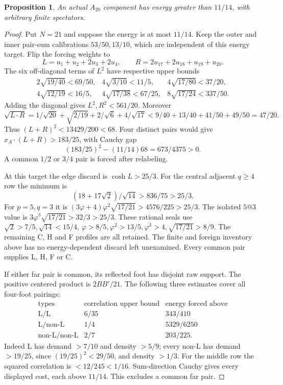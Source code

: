 \documentclass[11pt]{article}
\newtheorem{proposition}[theorem]{Proposition}
\theoremstyle{remark}
\newcommand{\ph}{\varphi}
\begin{document}
\begin{proposition}\label{prop:A20}
An actual \(A_{20}\) component has energy greater than \(11/14\),
with arbitrary finite spectators.
\end{proposition}
\begin{proof}
Put \(N=21\) and suppose the energy is at most \(11/14\).
Keep the outer and inner pair-sum calibrations \(53/50,13/10\),
which are independent of this energy target. Flip the forcing
weights to
\[
 L=u_1+u_2+2u_3+2u_4,\qquad
 R=2u_{17}+2u_{18}+u_{19}+u_{20}.
\]
The six off-diagonal terms of \(L^2\) have respective upper bounds
\[
\begin{array}{lll}
 2\sqrt{19/40}<69/50,&4\sqrt{3/10}<11/5,&
 4\sqrt{17/80}<37/20,\\
 4\sqrt{12/19}<16/5,&4\sqrt{17/38}<67/25,&
 8\sqrt{17/24}<337/50 .
\end{array}
\]
Adding the diagonal gives \(L^2,R^2<561/20\). Moreover
\[
 \sqrt{L\cdot R}
 =1/\sqrt{20}+\sqrt{2/19}+2/\sqrt6+4/\sqrt{17}
 <9/40+13/40+41/50+49/50=47/20.
\]
Thus \((L+R)^2<13429/200<68\). Four distinct pairs would give
\(x_A\cdot(L+R)>183/25\), with Cauchy gap
\[
 (183/25)^2-(11/14)68=673/4375>0.
\]
A common \(1/2\) or \(3/4\) pair is forced after relabeling.

At this target the edge discard is \(\cosh L>25/3\).
For the central adjacent \(q\ge4\) row the minimum is
\[
 (18+17\sqrt2)/\sqrt{14}>836/75>25/3.
\]
For \(p=5,q=3\) it is
\((3\ph+4)\ph^2\sqrt{17/21}>4576/225>25/3\).
The isolated \(5@3\) value is
\(3\ph^3\sqrt{17/21}>32/3>25/3\).
These rational seals use \(\sqrt2>7/5,\sqrt{14}<15/4\),
\(\ph>8/5,\ph^2>13/5,\ph^3>4,\sqrt{17/21}>8/9\).
The remaining C, H and F profiles are all retained.
The finite and foreign inventory above has no energy-dependent
discard left unexamined. Every common pair supplies L, H, F or C.

If either far pair is common, its reflected foot has disjoint raw
support. The positive centered product is \(2BB'/21\).
The following three estimates cover all four-foot pairings:
\[
\begin{array}{c|c|c}
 \text{types}&\text{correlation upper bound}
                         &\text{energy forced above}\\ \hline
 \mathrm L/\mathrm L&6/35&343/410\\
 \mathrm L/\text{non-L}&1/4&5329/6250\\
 \text{non-L}/\text{non-L}&2/7&203/225 .
\end{array}
\]
Indeed L has demand \(>7/10\) and density \(>5/9\);
every non-L has demand \(>19/25\), since
\((19/25)^2<29/50\), and density \(>1/3\).
For the middle row the squared correlation is
\(<12/245<1/16\). Sum-direction Cauchy gives every displayed cost,
each above \(11/14\). This excludes a common far pair.


\end{proof}
\end{document}

